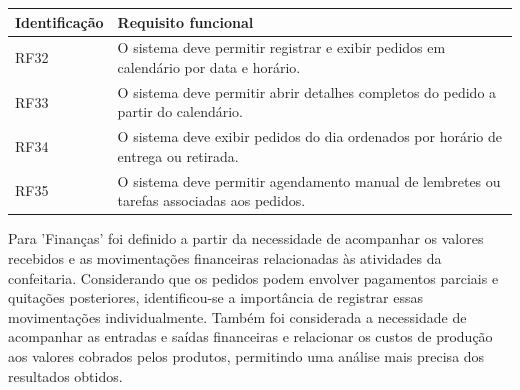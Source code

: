 \begin{quadro}
    \centering
    \label{quadro:rf_agenda}

    \begin{tabular}{|p{3cm}|p{11cm}|}
        \hline
        \textbf{Identificação} & \textbf{Requisito funcional} \\ \hline

        RF32 & O sistema deve permitir registrar e exibir pedidos em calendário por data e horário. \\ \hline

        RF33 & O sistema deve permitir abrir detalhes completos do pedido a partir do calendário. \\ \hline

        RF34 & O sistema deve exibir pedidos do dia ordenados por horário de entrega ou retirada. \\ \hline

        RF35 & O sistema deve permitir agendamento manual de lembretes ou tarefas associadas aos pedidos. \\ \hline
    \end{tabular}

    \vspace{0.2cm}
\end{quadro}


Para 'Finanças' foi definido a partir da necessidade de acompanhar os valores recebidos e as movimentações financeiras relacionadas às atividades da confeitaria. Considerando que os pedidos podem envolver pagamentos parciais e quitações posteriores, identificou-se a importância de registrar essas movimentações individualmente. Também foi considerada a necessidade de acompanhar as entradas e saídas financeiras e relacionar os custos de produção aos valores cobrados pelos produtos, permitindo uma análise mais precisa dos resultados obtidos.


